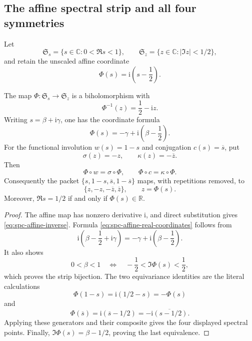 \subsection{The affine spectral strip and all four symmetries}

Let
\[
 \mathfrak S_s=\{s\in\mathbb C:0<\Re s<1\},
 \qquad
 \mathfrak S_z=\{z\in\mathbb C:|\Im z|<1/2\},
\]
and retain the unscaled affine coordinate
\begin{equation}
\label{eq:spc-affine-coordinate}
 \Phi(s)=\mathrm i\left(s-\frac12\right).
\end{equation}

\begin{proposition}
\label{prop:spc-affine-strip}
The map \(\Phi:\mathfrak S_s\to\mathfrak S_z\) is a biholomorphism with
\begin{equation}
\label{eq:spc-affine-inverse}
 \Phi^{-1}(z)=\frac12-\mathrm iz.
\end{equation}
Writing \(s=\beta+\mathrm i\gamma\), one has the coordinate formula
\begin{equation}
\label{eq:spc-affine-real-coordinates}
 \Phi(s)=-\gamma+\mathrm i\left(\beta-\frac12\right).
\end{equation}
For the functional involution \(w(s)=1-s\) and conjugation
\(c(s)=\overline s\), put
\[
 \sigma(z)=-z,
 \qquad
 \kappa(z)=-\overline z.
\]
Then
\begin{equation}
\label{eq:spc-affine-equivariance}
 \Phi\circ w=\sigma\circ\Phi,
 \qquad
 \Phi\circ c=\kappa\circ\Phi.
\end{equation}
Consequently the packet
\(\{s,1-s,\overline s,1-\overline s\}\) maps, with repetitions removed, to
\begin{equation}
\label{eq:spc-spectral-packet}
 \{z,-z,-\overline z,\overline z\},
 \qquad z=\Phi(s).
\end{equation}
Moreover, \(\Re s=1/2\) if and only if \(\Phi(s)\in\mathbb R\).
\end{proposition}

\begin{proof}
The affine map has nonzero derivative \(\mathrm i\), and direct substitution
gives \eqref{eq:spc-affine-inverse}.  Formula
\eqref{eq:spc-affine-real-coordinates} follows from
\[
 \mathrm i\left(\beta-\frac12+\mathrm i\gamma\right)
 =-\gamma+\mathrm i\left(\beta-\frac12\right).
\]
It also shows
\[
 0<\beta<1
 \quad\Longleftrightarrow\quad
 -\frac12<\Im\Phi(s)<\frac12,
\]
which proves the strip bijection.  The two equivariance identities are the
literal calculations
\[
 \Phi(1-s)=\mathrm i(1/2-s)=-\Phi(s)
\]
and
\[
 \Phi(\overline s)
 =\mathrm i(\overline s-1/2)
 =-\overline{\mathrm i(s-1/2)}.
\]
Applying these generators and their composite gives the four displayed
spectral points.  Finally,
\(\Im\Phi(s)=\beta-1/2\), proving the last equivalence.
\end{proof}

